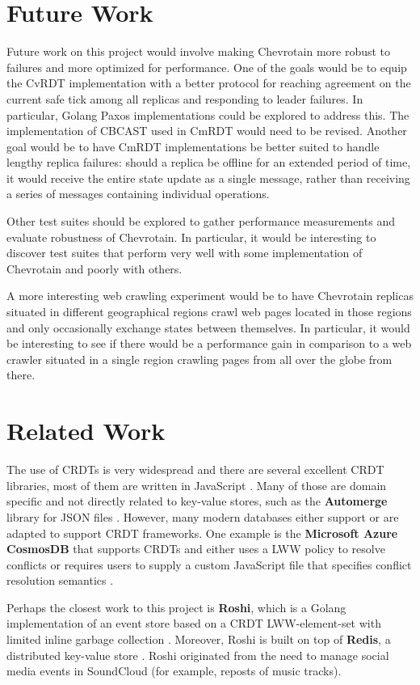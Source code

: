 \documentclass[sigconf,nonacm,10pt]{acmart}
\begin{document}
\section{Future Work}
Future work on this project would involve making Chevrotain more robust to failures and more optimized for performance. One of the goals would be to equip the CvRDT implementation with a better protocol for reaching agreement on the current safe tick among all replicas and responding to leader failures. In particular, Golang Paxos implementations \cite{paxos} could be explored to address this. The implementation of CBCAST used in CmRDT would need to be revised. Another goal would be to have CmRDT implementations be better suited to handle lengthy replica failures: should a replica be offline for an extended period of time, it would receive the entire state update as a single message, rather than receiving a series of messages containing individual operations.

Other test suites should be explored to gather performance measurements and evaluate robustness of Chevrotain. In particular, it would be interesting to discover test suites that perform very well with some implementation of Chevrotain and poorly with others.

A more interesting web crawling experiment would be to have Chevrotain replicas situated in different geographical regions crawl web pages located in those regions and only occasionally exchange states between themselves. In particular, it would be interesting to see if there would be a performance gain in comparison to a web crawler situated in a single region crawling pages from all over the globe from there.

\section{Related Work}
The use of CRDTs is very widespread and there are several excellent CRDT libraries, most of them are written in JavaScript \cite{crdt}. Many of those are domain specific and not directly related to key-value stores, such as the \textbf{Automerge} library for JSON files \cite{automerge}. However, many modern databases either support or are adapted to support CRDT frameworks. One example is the \textbf{Microsoft Azure CosmosDB} that supports CRDTs and either uses a LWW policy to resolve conflicts or requires users to supply a custom JavaScript file that specifies conflict resolution semantics \cite{cosmosdb}. 

Perhaps the closest work to this project is \textbf{Roshi}, which is a Golang implementation of an event store based on a CRDT LWW-element-set with limited inline garbage collection \cite{roshi}. Moreover, Roshi is built on top of \textbf{Redis}, a distributed key-value store \cite{redis}. Roshi originated from the need to manage social media events in SoundCloud (for example, reposts of music tracks).
\end{document}
